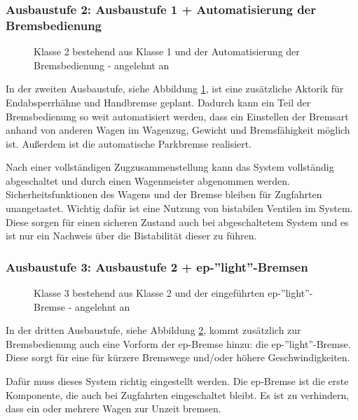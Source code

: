 \subsubsection{Ausbaustufe 2: Ausbaustufe 1 + Automatisierung der Bremsbedienung}
\begin{figure}[htbp] 
    
    \caption{Klasse 2 bestehend aus Klasse 1 und der Automatisierung der Bremsbedienung - angelehnt an \cite{ETR_3}}
    \label{fig:Klasse2}
\end{figure} 
In der zweiten Ausbaustufe, siehe Abbildung \ref{fig:Klasse2}, ist eine zusätzliche Aktorik für Endabsperrhähne und Handbremse geplant. Dadurch kann ein Teil der Bremsbedienung so weit automatisiert werden, dass ein Einstellen der Bremsart anhand von anderen Wagen im Wagenzug, Gewicht und Bremsfähigkeit möglich ist. Außerdem ist die automatische Parkbremse realisiert.\par
Nach einer vollständigen Zugzusammenstellung kann das System vollständig abgeschaltet und durch einen Wagenmeister abgenommen werden. Sicherheitsfunktionen des Wagens und der Bremse bleiben für Zugfahrten unangetastet. Wichtig dafür ist eine Nutzung von bistabilen Ventilen im System. Diese sorgen für einen sicheren Zustand auch bei abgeschaltetem System und es ist nur ein Nachweis über die Bistabilität dieser zu führen.

\subsubsection{Ausbaustufe 3: Ausbaustufe 2 + ep-''light''-Bremsen}
\begin{figure}[htbp] 
    
    \caption{Klasse 3 bestehend aus Klasse 2 und der eingeführten ep-''light''-Bremse - angelehnt an \cite{ETR_3}}
    \label{fig:Klasse3}
\end{figure} 
In der dritten Ausbaustufe, siehe Abbildung \ref{fig:Klasse3}, kommt zusätzlich zur Bremsbedienung auch eine Vorform der \gls{ep-Bremse} hinzu: die ep-''light''-Bremse. Diese sorgt für eine für kürzere Bremswege und/oder höhere Geschwindigkeiten.\par
Dafür muss dieses System richtig eingestellt werden. Die ep-Bremse ist die erste Komponente, die auch bei Zugfahrten eingeschaltet bleibt. Es ist zu verhindern, dass ein oder mehrere Wagen zur Unzeit bremsen.

